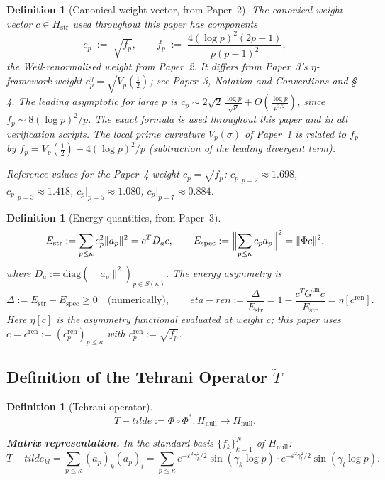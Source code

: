 \documentclass[11pt]{article}
\def\Tt{T-tilde}%
\def\etaren{eta-ren}%
\newtheorem{definition}[theorem]{Definition}
\newcommand{\Hstr}{H_{\mathrm{str}}}
\newcommand{\Hnull}{H_{\mathrm{null}}}
\newcommand{\Estr}{E_{\mathrm{str}}}
\newcommand{\Espec}{E_{\mathrm{spec}}}
\newcommand{\etaren}{\eta_{\mathrm{ren}}}
\newcommand{\Gun}{G^{\mathrm{un}}}
\newcommand{\Tt}{\widetilde{T}}
\newcommand{\fp}{f_p}
\newcommand{\Da}{D_a}
\begin{document}
\begin{definition}[Canonical weight vector, from Paper~2]\label{def:weight}
The canonical weight vector $c\in\Hstr$ used throughout this paper
has components
\[
  c_p \;:=\; \sqrt{\fp}, \qquad
  \fp \;:=\; \frac{4(\log p)^2(2p-1)}{p(p-1)^2},
\]
the Weil-renormalised weight from Paper~2.
It differs from Paper~3's $\eta$-framework weight
$c_p^\eta = \sqrt{V_p(\tfrac12)}$; see Paper~3, Notation and Conventions and \S\,4.
The leading asymptotic for large $p$ is
$c_p \sim 2\sqrt{2}\,\frac{\log p}{\sqrt{p}} + O\!\left(\frac{\log p}{p^{3/2}}\right)$,
since $f_p \sim 8(\log p)^2/p$.
The exact formula is used throughout this paper and in all verification scripts.
The local prime curvature $V_p(\sigma)$ of Paper~1 is related to $\fp$ by
$\fp = V_p(\tfrac12) - 4(\log p)^2/p$
(subtraction of the leading divergent term).

Reference values for the Paper~4 weight $c_p=\sqrt{f_p}$:
$c_p|_{p=2}\approx 1.698$, $c_p|_{p=3}\approx 1.418$,
$c_p|_{p=5}\approx 1.080$, $c_p|_{p=7}\approx 0.884$.
\end{definition}

\begin{definition}[Energy quantities, from Paper~3]
\[
\Estr := \sum_{p\leq\kappa}c_p^2\|a_p\|^2 = c^T \Da c,
\qquad
\Espec := \Bigl\|\sum_{p\leq\kappa}c_p a_p\Bigr\|^2 = \|\Phi c\|^2,
\]
where $\Da := \mathrm{diag}(\|a_p\|^2)_{p\in S(\kappa)}$.
The energy asymmetry is
\[
\Delta := \Estr - \Espec \geq 0\quad\text{(numerically)},
\qquad
\etaren := \frac{\Delta}{\Estr}
= 1 - \frac{c^T\Gun c}{\Estr}
= \eta[c^{\mathrm{ren}}].
\]
Here $\eta[c]$ is the asymmetry functional evaluated at weight $c$;
this paper uses $c=c^{\mathrm{ren}}:=(c_p^{\mathrm{ren}})_{p\le\kappa}$
with $c_p^{\mathrm{ren}}:=\sqrt{f_p}$.
\end{definition}

\subsection{Definition of the Tehrani Operator $\widetilde{T}$}

\begin{definition}[Tehrani operator]\label{def:Tt}
\[
\Tt := \Phi\circ\Phi^*\colon\Hnull\to\Hnull.
\]

\textbf{Matrix representation.}
In the standard basis $\{f_k\}_{k=1}^N$ of $\Hnull$:
\[
\Tt_{kl}
= \sum_{p\leq\kappa}(a_p)_k(a_p)_l
= \sum_{p\leq\kappa}
e^{-\varepsilon^2\gamma_k^2/2}\sin(\gamma_k\log p)
\cdot
e^{-\varepsilon^2\gamma_l^2/2}\sin(\gamma_l\log p).
\]
\end{definition}
\end{document}
